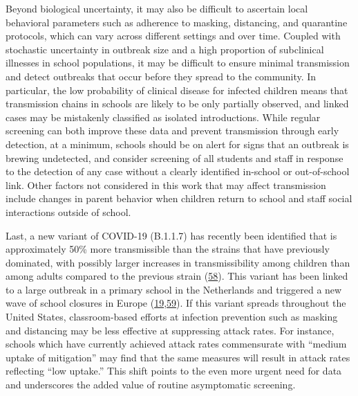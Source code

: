 \documentclass[
]{article}
\begin{document}
Beyond biological uncertainty, it may also be difficult to ascertain
local behavioral parameters such as adherence to masking, distancing,
and quarantine protocols, which can vary across different settings and
over time. Coupled with stochastic uncertainty in outbreak size and a
high proportion of subclinical illnesses in school populations, it may
be difficult to ensure minimal transmission and detect outbreaks that
occur before they spread to the community. In particular, the low
probability of clinical disease for infected children means that
transmission chains in schools are likely to be only partially observed,
and linked cases may be mistakenly classified as isolated introductions.
While regular screening can both improve these data and prevent
transmission through early detection, at a minimum, schools should be on
alert for signs that an outbreak is brewing undetected, and consider
screening of all students and staff in response to the detection of any
case without a clearly identified in-school or out-of-school link. Other
factors not considered in this work that may affect transmission include
changes in parent behavior when children return to school and staff
social interactions outside of school.

Last, a new variant of COVID-19 (B.1.1.7) has recently been identified
that is approximately 50\% more transmissible than the strains that have
previously dominated, with possibly larger increases in transmissibility
among children than among adults compared to the previous strain
(\protect\hyperlink{ref-volz_transmission_2021}{58}). This variant has
been linked to a large outbreak in a primary school in the Netherlands
and triggered a new wave of school closures in Europe
(\protect\hyperlink{ref-staton_european_2021}{19},\protect\hyperlink{ref-vogeljan_15_school_2021}{59}).
If this variant spreads throughout the United States, classroom-based
efforts at infection prevention such as masking and distancing may be
less effective at suppressing attack rates. For instance, schools which
have currently achieved attack rates commensurate with ``medium uptake
of mitigation'' may find that the same measures will result in attack
rates reflecting ``low uptake.'' This shift points to the even more
urgent need for data and underscores the added value of routine
asymptomatic screening.
\end{document}
